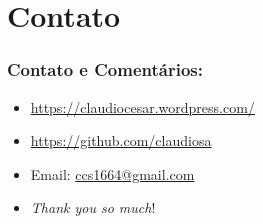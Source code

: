 \documentclass{beamer}
\begin{document}
\section*{Contato}

\begin{frame}
\frametitle{Contato e Comentários:}
  
\begin{block}{}
  \begin{itemize}
  \item \url{https://claudiocesar.wordpress.com/}
   \item \url{https://github.com/claudiosa}
    \item Email: \url{ccs1664@gmail.com}

  \item \textit{Thank you so much}!

  \end{itemize}
  \end{block}

\end{frame}


\end{document}
